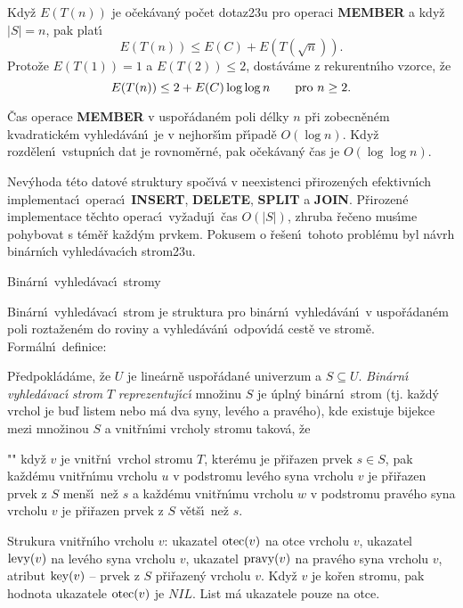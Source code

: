 \flushpar Kdy\v z $E(T(n))$ je o\v cek\'avan\'y po\v cet dotaz\accent23u pro operaci 
{\bf MEMBER} a kdy\v z $|S|=n$, pak plat\'\i\ 
$$E(T(n))\le E(C)+E(T(\sqrt n)).$$
Proto\v ze $E(T(1))=1$ a $E(T(2))\le 2$, dost\'av\'ame z rekurentn\'\i ho 
vzorce, \v ze 
$$E(T(n))\le 2+E(C)\log\log n\qquad\text{\rm pro }n\ge 2.$$


\v Cas operace {\bf MEMBER} v uspo\v r\'adan\'em poli d\'elky $
n$ p\v ri 
zobec\-n\v en\'em kvadra\-tick\'em vyhled\'av\'an\'\i\ je v nejhor\v s\'\i m 
p\v r\'\i pa\-d\v e $O(\log n)$. Kdy\v z rozd\v elen\'\i\ vstupn\'\i ch dat je 
rovno\-m\v er\-n\'e, pak o\v cek\'avan\'y \v cas je $O(\log\log n)$. 
\endproclaim

\flushpar Nev\'yhoda t\'eto datov\'e struktury 
spo\v c\'\i v\'a v neexistenci p\v riroze\-n\'ych efektivn\'\i ch implementac\'\i\ 
ope\-rac\'\i\ {\bf INSERT}, {\bf DELETE}, {\bf SPLIT} a {\bf JOIN}. P\v rirozen\'e 
implementace t\v echto ope\-rac\'\i\ vy\v za\-duj\'\i\ \v cas 
$O(|S|)$, zhruba \v re\v ceno mus\'\i me pohybovat s t\'em\v e\v r ka\v z\-d\'ym prvkem. 
Pokusem o \v re\v sen\'\i\ 
tohoto probl\'emu byl n\'avrh bin\'ar\-n\'\i ch vyhled\'avac\'\i ch 
strom\accent23u.
\medskip

\heading 
Bin\'arn\'\i\ vyhled\'avac\'\i\ stromy
\endheading

\flushpar Bin\'arn\'\i\ vyhled\'avac\'\i\ strom je struktura pro bin\'ar\-n\'\i\ 
vyhled\'av\'an\'\i\ v uspo\v r\'ada\-n\'em poli rozta\-\v zen\'em do roviny a 
vyhled\'av\'an\'\i\ odpo\-v\'\i\-d\'a cest\v e ve stro\-m\v e. Form\'aln\'\i\ 
definice:

\flushpar P\v redpokl\'ad\'ame, \v ze $U$ je line\'arn\v e uspo\v r\'adan\'e 
univerzum a $S\subseteq U$.  \emph{Bin\'arn\'\i} \emph{vyhled\'avac\'\i} 
\emph{strom} $T$ \emph{reprezentuj\'\i c\'\i} mno\v zinu $S$ je \'upln\'y 
bin\'arn\'\i\ strom (tj. ka\v zd\'y vrchol je bu\v d listem nebo m\'a 
dva syny, lev\'eho a prav\'eho), kde existuje bijekce mezi 
mno\v zinou $S$ a vnit\v rn\'\i mi vrcholy stromu takov\'a, \v ze
\roster
\item"{}"
kdy\v z $v$ je vnit\v rn\'\i\ vrchol stromu $T$, kter\'emu je p\v ri\v razen 
prvek $s\in S$, pak ka\v zd\'emu vnit\v rn\'\i mu vrcholu $u$ v 
podstromu lev\'eho syna vrcholu $v$ je p\v ri\v razen prvek z $S$ 
men\v s\'\i\ ne\v z $s$ a ka\v zd\'emu vnit\v rn\'\i mu vrcholu $
w$ v 
podstromu prav\'eho syna vrcholu $v$ je p\v ri\v razen prvek z $S$ 
v\v et\v s\'\i\ ne\v z $s$.
\endroster
\medskip

\flushpar Strukura vnit\v rn\'\i ho vrcholu $v$:\newline 
ukazatel $\operatorname{otec}(v)$ na otce vrcholu $v$,\newline 
ukazatel $\operatorname{levy}(v)$ na lev\'eho syna vrcholu $v$,\newline 
ukazatel $\operatorname{pravy}(v)$ na prav\'eho syna vrcholu $v$,\newline 
atribut $\operatorname{key}(v)$ -- prvek z $S$ p\v ri\v razen\'y vrcholu $v$.
Kdy\v z $v$ je ko\v ren stromu, pak hodnota ukazatele $\operatorname{otec}(v)$ 
je $NIL$. List m\'a ukazatele pouze na otce.
\medskip

